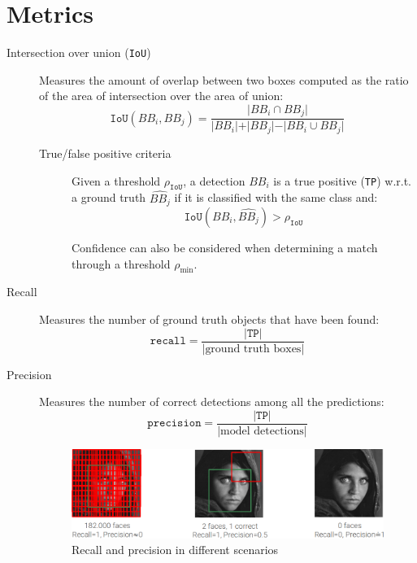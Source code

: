 \section{Metrics}

\begin{description}
    \item[Intersection over union (\texttt{IoU})] 
        Measures the amount of overlap between two boxes computed as the ratio of the area of intersection over the area of union:
        \[ \texttt{IoU}(BB_i, BB_j) = \frac{\vert BB_i \cap BB_j \vert}{\vert BB_i \vert + \vert BB_j \vert - \vert BB_i \cup BB_j \vert} \]

        \begin{description}
            \item[True/false positive criteria] 
                Given a threshold $\rho_\texttt{IoU}$, a detection $BB_i$ is a true positive (\texttt{TP}) w.r.t. a ground truth $\hat{BB_j}$ if it is classified with the same class and:
                \[ \texttt{IoU}(BB_i, \hat{BB_j}) > \rho_\texttt{IoU} \]

                \begin{remark}
                    Confidence can also be considered when determining a match through a threshold $\rho_\text{min}$.
                \end{remark}
        \end{description}

    \item[Recall]
        Measures the number of ground truth objects that have been found:
        \[ \texttt{recall} = \frac{\vert \texttt{TP} \vert}{\vert \text{ground truth boxes} \vert} \]

    \item[Precision]
        Measures the number of correct detections among all the predictions:
        \[ \texttt{precision} = \frac{\vert \texttt{TP} \vert}{\vert \text{model detections} \vert} \]

    \begin{figure}[H]
        \centering
        \includegraphics[width=0.7\linewidth]{./img/obj_det_recall_precision.png}
        \caption{
            Recall and precision in different scenarios
        }
    \end{figure}


\end{description}
